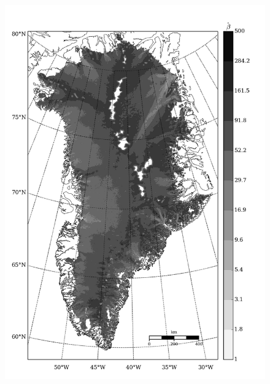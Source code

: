 \begin{figure}
  \centering
  \begin{minipage}[b]{0.47\linewidth}
    \includegraphics[width=1.0\textwidth]{images/greenland/stats/GLM_beta_no_driving_stress.jpg}
  \end{minipage}
  \quad
  \begin{minipage}[b]{0.47\linewidth}

\end{minipage}
\end{figure}
